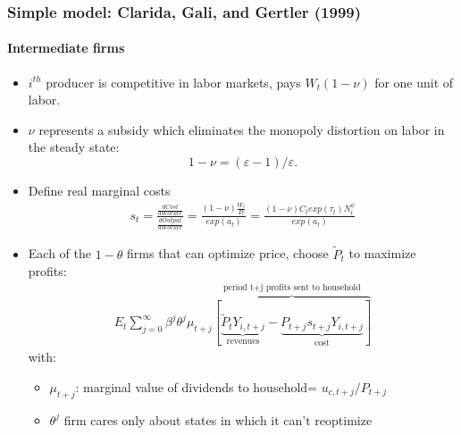 \documentclass[handout]{beamer}  %
\begin{document}
\begin{frame}
\frametitle{Simple model: Clarida, Gali, and Gertler (1999)}\framesubtitle{Intermediate firms}\footnotesize
\begin{itemize}
  \item $i^{th}$ producer is competitive in labor markets, pays $W_{t}\left( 1-\nu \right)$ for one unit of labor.
  \item $\nu $ represents a subsidy which eliminates the monopoly distortion on labor in the steady state:
  $$1-\nu=\left( \varepsilon -1\right) /\varepsilon .$$
  \item Define real marginal costs
  \begin{align*}
    s_t = \frac{\frac{d Cost}{d Worker}}{\frac{dOutput}{dWorker}} = \frac{(1-\nu)\frac{W_t}{P_t}}{exp(a_t)} = \frac{(1-\nu)C_t exp(\tau_t) N_t^\phi}{exp(a_t)}
  \end{align*}
  \item Each of the $1-\theta$ firms that can optimize price, choose $\tilde{P}_t$ to maximize profits:
  \begin{align*}
    E_t \sum_{j=0}^\infty \beta^j \theta^j \mu_{t+j} \overbrace{[\underbrace{\tilde{P}_t Y_{i,t+j}}_\text{revenues} - \underbrace{P_{t+j} s_{t+j} Y_{i,t+j}}_\text{cost}]}^\text{period t+j profits sent to household}
  \end{align*}
  with:
  \begin{itemize}
    \item $\mu_{t+j}$: marginal value of dividends to household= $u_{c,t+j}/P_{t+j}$
    \item $\theta^j$ firm cares only about states in which it can't reoptimize
  \end{itemize}
\end{itemize}
\end{frame}
\end{document}
